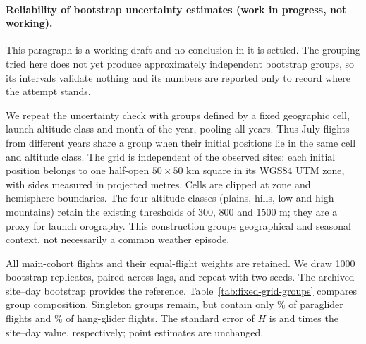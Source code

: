 \begin{wipblock}
\paragraph{Reliability of bootstrap uncertainty estimates (work in progress, not
working).}
\label{sec:fixed-bootstrap-reliability}

This paragraph is a working draft and no conclusion in it is settled. The grouping
tried here does not yet produce approximately independent bootstrap groups, so its
intervals validate nothing and its numbers are reported only to record where the
attempt stands.

We repeat the uncertainty check with groups defined by a fixed geographic cell,
launch-altitude class and month of the year, pooling all years. Thus July flights
from different years share a group when their initial positions lie in the same
cell and altitude class. The grid is independent of the observed sites: each
initial position belongs to one half-open $50\times50$ km square in its WGS84 UTM
zone, with sides measured in projected metres. Cells are clipped at zone and
hemisphere boundaries. The four altitude classes (plains, hills, low and high
mountains) retain the existing thresholds of 300, 800 and 1500 m; they are a proxy
for launch orography. This construction groups geographical and seasonal context,
not necessarily a common weather episode.

All main-cohort flights and their equal-flight weights are retained. We draw 1000
bootstrap replicates, paired across lags, and repeat with two seeds. The archived
site--day bootstrap provides the reference. Table~\ref{tab:fixed-grid-groups}
compares group composition. Singleton groups remain, but contain only
\ChThreeParaGridSingletonFlightPct\% of paraglider flights and
\ChThreeHangGridSingletonFlightPct\% of hang-glider flights. The standard error of
$H$ is \ChThreeParaGridHFactor{} and \ChThreeHangGridHFactor{} times the site--day
value, respectively; point estimates are unchanged.

\begin{table}[htbp]
 \centering\small\setlength{\tabcolsep}{4pt}
 
 \caption{Bootstrap groups of the main cohort before and after cell--altitude--month
 grouping. ``Before'' are the site--day groups that resample every other interval in
 this chapter; ``after'' are the alternative groups introduced in this check, used only
 here. Median size is the number of flights per new group. Singletons are expressed as
 a percentage of new groups; maximum share is the largest group's percentage of
 cohort flights. All years are pooled within each month.}
 \label{tab:fixed-grid-groups}
\end{table}


\end{wipblock}
